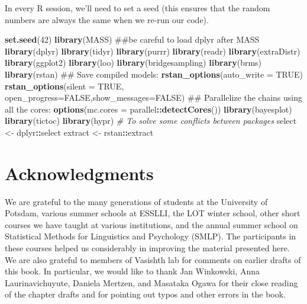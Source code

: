 \documentclass[12pt,]{krantz}
\newenvironment{Shaded}{\begin{snugshade}}{\end{snugshade}}
\newcommand{\KeywordTok}[1]{\textcolor[rgb]{0.13,0.29,0.53}{\textbf{#1}}}
\newcommand{\DataTypeTok}[1]{\textcolor[rgb]{0.13,0.29,0.53}{#1}}
\newcommand{\DecValTok}[1]{\textcolor[rgb]{0.00,0.00,0.81}{#1}}
\newcommand{\StringTok}[1]{\textcolor[rgb]{0.31,0.60,0.02}{#1}}
\newcommand{\CommentTok}[1]{\textcolor[rgb]{0.56,0.35,0.01}{\textit{#1}}}
\newcommand{\OtherTok}[1]{\textcolor[rgb]{0.56,0.35,0.01}{#1}}
\newcommand{\OperatorTok}[1]{\textcolor[rgb]{0.81,0.36,0.00}{\textbf{#1}}}
\newcommand{\NormalTok}[1]{#1}
\theoremstyle{definition}
\theoremstyle{definition}
\theoremstyle{definition}
\theoremstyle{remark}
\begin{document}
In every R session, we'll need to set a seed (this ensures that the
random numbers are always the same when we re-run our code).

\begin{Shaded}
\begin{Highlighting}[]
\KeywordTok{set.seed}\NormalTok{(}\DecValTok{42}\NormalTok{)}
\KeywordTok{library}\NormalTok{(MASS)}
\NormalTok{##be careful to load dplyr after MASS}
\KeywordTok{library}\NormalTok{(dplyr)}
\KeywordTok{library}\NormalTok{(tidyr)}
\KeywordTok{library}\NormalTok{(purrr)}
\KeywordTok{library}\NormalTok{(readr)}
\KeywordTok{library}\NormalTok{(extraDistr)}
\KeywordTok{library}\NormalTok{(ggplot2)}
\KeywordTok{library}\NormalTok{(loo)}
\KeywordTok{library}\NormalTok{(bridgesampling)}
\KeywordTok{library}\NormalTok{(brms)}
\KeywordTok{library}\NormalTok{(rstan)}
\NormalTok{## Save compiled models:}
\KeywordTok{rstan_options}\NormalTok{(}\DataTypeTok{auto_write =} \OtherTok{TRUE}\NormalTok{)}
\KeywordTok{rstan_options}\NormalTok{(}\DataTypeTok{silent =} \OtherTok{TRUE}\NormalTok{, }\DataTypeTok{open_progress=}\OtherTok{FALSE}\NormalTok{,}\DataTypeTok{show_messages=}\OtherTok{FALSE}\NormalTok{)}
\NormalTok{## Parallelize the chains using all the cores:}
\KeywordTok{options}\NormalTok{(}\DataTypeTok{mc.cores =}\NormalTok{ parallel}\OperatorTok{::}\KeywordTok{detectCores}\NormalTok{())}
\KeywordTok{library}\NormalTok{(bayesplot)}
\KeywordTok{library}\NormalTok{(tictoc)}
\KeywordTok{library}\NormalTok{(hypr)}
\CommentTok{# To solve some conflicts between  packages}
\NormalTok{select <-}\StringTok{ }\NormalTok{dplyr}\OperatorTok{::}\NormalTok{select}
\NormalTok{extract <-}\StringTok{ }\NormalTok{rstan}\OperatorTok{::}\NormalTok{extract}
\end{Highlighting}
\end{Shaded}

\section{Acknowledgments}\label{acknowledgments}

We are grateful to the many generations of students at the University of
Potsdam, various summer schools at ESSLLI, the LOT winter school, other
short courses we have taught at various institutions, and the annual
summer school on Statistical Methods for Linguistics and Psychology
(SMLP). The participants in these courses helped us considerably in
improving the material presented here. We are also grateful to members
of Vasishth lab for comments on earlier drafts of this book. In
particular, we would like to thank Jan Winkowski, Anna Laurinavichuyute,
Daniela Mertzen, and Masataka Ogawa for their close reading of the
chapter drafts and for pointing out typos and other errors in the book.
\end{document}
